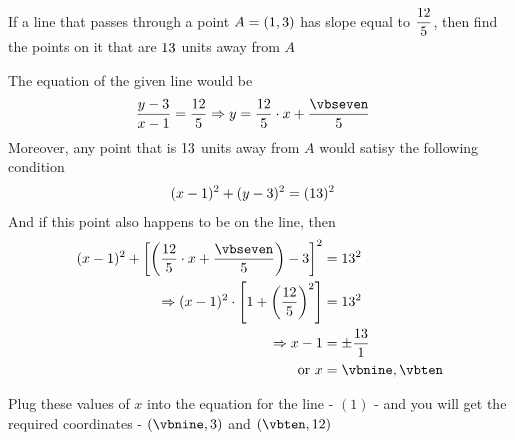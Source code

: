 \renewcommand{\vbsix}{\dfrac{\vbthree}{\vbfour}}
\gcalcexpr[0]{\vbnine}{(\vbfive / \vbeight) + \vbone}
\gcalcexpr[0]{\vbten}{\vbone - (\vbfive / \vbeight)}

\question If a line that passes through a point $A = (1, 3)$ has slope equal to $\vbsix$, then 
find the points on it that are $13$ units away from $A$

\insertQR{}

\watchout

\ifprintanswers
\fi 

\begin{solution}
	The equation of the given line would be
	\begin{align}
		\dfrac{y-\vbtwo}{x-\vbone} &= \vbsix \Rightarrow y = \vbsix\cdot x + \dfrac{\vbseven}{\vbfour}
	\end{align}
	Moreover, any point that is $13$ units away from $A$ would satisy 
	the following condition 
	\begin{align}
		(x - 1)^2 + (y-3)^2 &= (13)^2 
	\end{align}
	And if this point also happens to be on the line, then 
	\begin{align}
		(x-\vbone)^2 + \left[ \left( \vbsix\cdot x + \dfrac{\vbseven}{\vbfour}\right) - \vbtwo \right]^2 &= \vbfive^2 \\
		\Rightarrow (x - \vbone)^2\cdot\left[ 1 + \left( \vbsix \right)^2\right] &= \vbfive^2 \\
		\Rightarrow x - \vbone &= \pm\dfrac{\vbfive}{\vbeight} \\
		\text{ or } x &= \vbnine, \vbten
	\end{align}
	
	\gcalcexpr{\vbfive}{\vbthree / \vbfour} %
    
    Plug these values of $x$ into the equation for the line - $(1)$ - and you will 
    get the required coordinates -  $(\vbnine, \vbtwo)$ and $(\vbten, \vbthree)$
\end{solution}
